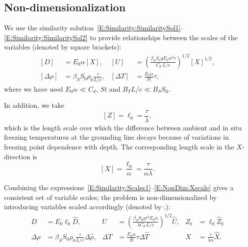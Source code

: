 \documentclass{jfm}
\begin{document}
\subsection{Non-dimensionalization}\label{S:Model:NonDim}
We use the similarity solution~\eqref{E:Similarity:SimilaritySol1}--\eqref{E:Similarity:SimilaritySol2} to provide relationships between the scales of the variables (denoted by square brackets):
\begin{align}
\left[D\right] &= E_0 \alpha \left[X\right], & \left[U\right] &= \left(\frac{\beta_S S_0 g E_0 \alpha^2 \tau}{C_d ~L/c}\right)^{1/2}[X]^{1/2},\label{E:Similarity:Scales1}\\
\left[\Delta \rho\right] &= \beta_S S_0 \rho_0 \frac{\tau}{L/c}, & \left[\Delta T\right] &= \frac{E_0 \alpha}{St}\tau,\label{E:Similarity:Scales2}
\end{align}
where we have used $E_0 \alpha \ll C_d$, $St$ and $B_T L /c \ll B_S S_0$.

In addition, we take
\begin{equation}
\left[Z\right] = \ell_0=\frac{ \tau }{\lambda},
\end{equation}
which is the length scale over which the difference between ambient and in situ freezing temperatures at the grounding line decays because of variations in freezing point dependence with depth. The corresponding length scale in the $X$-direction is
\begin{equation}\label{E:NonDim:Xscale}
\left[X\right] =\frac{ \ell_0}{\alpha}=\frac{ \tau }{\alpha \lambda}.
\end{equation}

Combining the expressions~\eqref{E:Similarity:Scales1}--\eqref{E:NonDim:Xscale} gives a consistent set of variable scales; the problem is non-dimensionalized by introducing variables scaled accordingly (denoted by  $\hat{.}$):
\begin{align}
D&= E_0 \ell_0 \hat{D}, & U&= \left(\frac{\beta_S S_0 g \tau^2 E_0 \alpha}{\lambda C_d ~L/c}\right)^{1/2}\hat{U}, & Z_b &= \ell_0 \hat{Z}_b\label{E:NonDim:NonDimVar1}\\
\Delta \rho &= \beta_S S_0 \rho_0 \frac{\tau}{L/c}\Delta \hat{\rho}, & \Delta T &= \frac{E_0 \alpha}{St}\tau \Delta \hat{T} & X &=\frac{\tau}{\lambda \alpha}\hat{X}. \label{E:NonDim:NonDimVar2}
\end{align}

 \renewcommand{\lambda}{\kappa}
\end{document}
